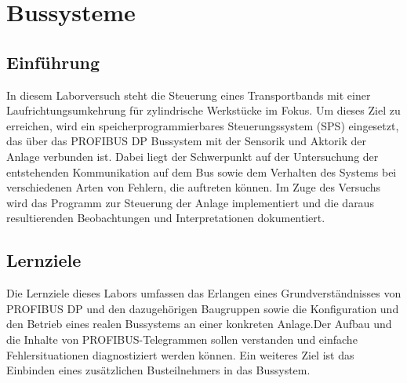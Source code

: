 \documentclass{report}
\begin{document}

\newpage

\tableofcontents

\listoffigures

\newpage

\chapter{Bussysteme}

\section{Einführung}
\label{sec:einfuhrung}

In diesem Laborversuch steht die Steuerung eines Transportbands mit einer Laufrichtungsumkehrung für zylindrische Werkstücke im Fokus. Um dieses Ziel zu erreichen, wird ein speicherprogrammierbares Steuerungssystem (SPS) eingesetzt, das über das PROFIBUS DP Bussystem mit der Sensorik und Aktorik der Anlage verbunden ist. Dabei liegt der Schwerpunkt auf der Untersuchung der entstehenden Kommunikation auf dem Bus sowie dem Verhalten des Systems bei verschiedenen Arten von Fehlern, die auftreten können. Im Zuge des Versuchs wird das Programm zur Steuerung der Anlage implementiert und die daraus resultierenden Beobachtungen und Interpretationen dokumentiert.

\section{Lernziele}

Die Lernziele dieses Labors umfassen das Erlangen eines Grundverständnisses von PROFIBUS DP und den dazugehörigen Baugruppen sowie die Konfiguration und den Betrieb eines realen Bussystems an einer konkreten Anlage.Der Aufbau und die Inhalte von PROFIBUS-Telegrammen sollen verstanden und einfache Fehlersituationen diagnostiziert werden können. Ein weiteres Ziel ist das Einbinden eines zusätzlichen Busteilnehmers in das Bussystem.
\end{document}

